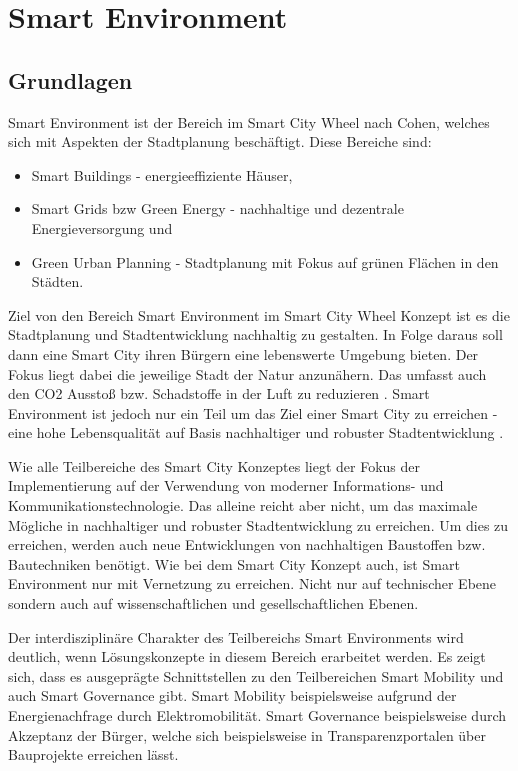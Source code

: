 \section{Smart Environment}
\label{sec:smart_environment}

\subsection{Grundlagen}
Smart Environment ist der Bereich im Smart City Wheel nach Cohen, welches sich mit Aspekten der Stadtplanung beschäftigt.
Diese Bereiche sind:
\begin{itemize}
	\item Smart Buildings - energieeffiziente Häuser,
	\item Smart Grids bzw Green Energy - nachhaltige und dezentrale Energieversorgung und
	\item Green Urban Planning - Stadtplanung mit Fokus auf grünen Flächen in den Städten.
\end{itemize}

Ziel von den Bereich Smart Environment im Smart City Wheel Konzept ist es die Stadtplanung und Stadtentwicklung nachhaltig zu gestalten.
In Folge daraus soll dann eine Smart City ihren Bürgern eine lebenswerte Umgebung bieten.
Der Fokus liegt dabei die jeweilige Stadt der Natur anzunähern.
Das umfasst auch den CO2 Ausstoß bzw. Schadstoffe in der Luft zu reduzieren \autocite[vgl.][S. 4]{Monzon.2015}.
Smart Environment ist jedoch nur ein Teil um das Ziel einer Smart City zu erreichen - eine hohe Lebensqualität auf Basis nachhaltiger und robuster Stadtentwicklung \autocite[vgl.][S. 3]{Monzon.2015}.

Wie alle Teilbereiche des Smart City Konzeptes liegt der Fokus der Implementierung auf der Verwendung von moderner Informations- und Kommunikationstechnologie.
Das alleine reicht aber nicht, um das maximale Mögliche in nachhaltiger und robuster Stadtentwicklung zu erreichen.
Um dies zu erreichen, werden auch neue Entwicklungen von nachhaltigen Baustoffen bzw. Bautechniken benötigt.
Wie bei dem Smart City Konzept auch, ist Smart Environment nur mit Vernetzung zu erreichen.
Nicht nur auf technischer Ebene sondern auch auf wissenschaftlichen und gesellschaftlichen Ebenen.

Der interdisziplinäre Charakter des Teilbereichs Smart Environments wird deutlich, wenn Lösungskonzepte in diesem Bereich erarbeitet werden.
Es zeigt sich, dass es ausgeprägte Schnittstellen zu den Teilbereichen Smart Mobility und auch Smart Governance gibt.
Smart Mobility beispielsweise aufgrund der Energienachfrage durch Elektromobilität.
Smart Governance beispielsweise durch Akzeptanz der Bürger, welche sich beispielsweise in Transparenzportalen über Bauprojekte erreichen lässt.

